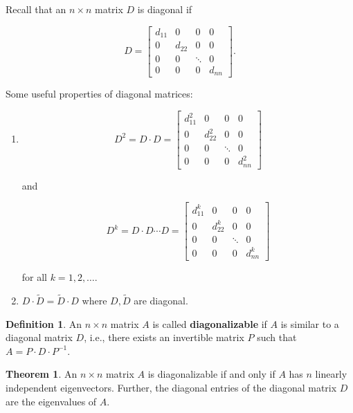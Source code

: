 \documentclass[12pt]{article}
\theoremstyle{definition}
\newtheorem*{definition}{Definition}
\newtheorem{theorem}{Theorem}[section]  %
\begin{document}
Recall that an $n \times n$ matrix $D$ is diagonal if

\[
D =
\begin{bmatrix}
d_{11} & 0 & 0 & 0\\
0 & d_{22} & 0 & 0\\
0 & 0 & \ddots & 0 \\
0& 0 & 0 & d_{nn}
\end{bmatrix}.
\]


Some useful properties of diagonal matrices:

\begin{enumerate}[label = (\arabic*)]
\item 

\[ D^2 = D \cdot D = 
\begin{bmatrix}
d_{11}^2 & 0 & 0 & 0\\
0 & d_{22}^2 & 0 & 0\\
0 & 0 & \ddots & 0 \\
0& 0 & 0 & d_{nn}^2
\end{bmatrix}
\]

and

\[ D^k = D \cdot D \cdots D = 
\begin{bmatrix}
d_{11}^k & 0 & 0 & 0\\
0 & d_{22}^k & 0 & 0\\
0 & 0 & \ddots & 0 \\
0& 0 & 0 & d_{nn}^k
\end{bmatrix}
\]

for all $k = 1, 2, \ldots$.


\item $D \cdot \tilde{D} = \tilde{D} \cdot D$ where $D, \tilde{D}$ are diagonal.
\end{enumerate}

\begin{definition}
An $n \times n$ matrix $A$ is called \textbf{diagonalizable} if $A$ is similar to
a diagonal matrix $D$, i.e., there exists an invertible matrix $P$ such that 
$A = P \cdot D \cdot P^{-1}$.
\end{definition}

\begin{theorem}
An $n \times n$ matrix $A$ is diagonalizable if and only if $A$ has $n$ linearly independent
eigenvectors. Further, the diagonal entries of the diagonal matrix $D$ are the eigenvalues
of $A$.
\end{theorem}
\end{document}
